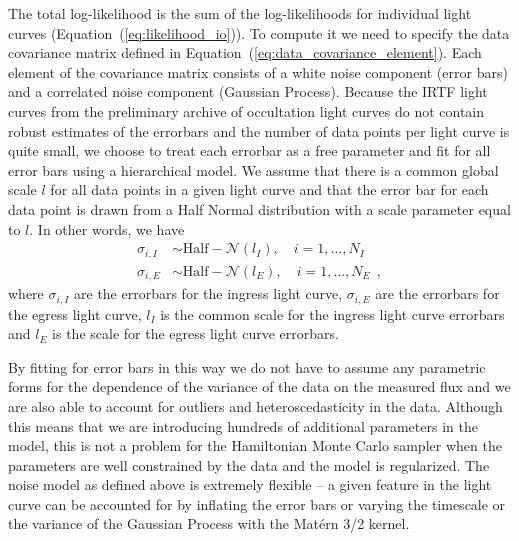 \documentclass[12pt,dvipsnames]{report}
\newcommand{\hquad}{~~}
\begin{document}
The total log-likelihood is the sum of the log-likelihoods for individual light curves 
(Equation~(\ref{eq:likelihood_io})). 
To compute it we need to specify the data covariance matrix defined in Equation~(\ref{eq:data_covariance_element}).
Each element of the covariance matrix consists of a white noise component (error bars) and a correlated noise component (Gaussian Process).
Because the IRTF light curves from the preliminary archive of occultation light curves 
do not contain robust estimates of the errorbars and the number of data points per light 
curve is quite small, we choose to treat each errorbar as a free parameter and fit for 
all error bars using a hierarchical model. 
We assume that there is a common global scale $l$ for all data points in a given light curve and that the error bar for each data point is drawn from a Half Normal distribution with a scale parameter equal to $l$.
In other words, we have 
\begin{align}
    \sigma_{i,I}&\sim \mathrm{Half}-\mathcal{N}(l_I),\quad i=1,\dots,N_I\\
    \sigma_{i,E}&\sim \mathrm{Half}-\mathcal{N}(l_E),\quad i=1,\dots, N_E
    \hquad,
\end{align}
where $\sigma_{i,I}$ are the errorbars for the ingress light curve, $\sigma_{i,E}$ are the errorbars for the egress light curve, $l_I$ is the common scale for the ingress light curve errorbars and $l_E$ is the scale for the egress light curve errorbars.

By fitting for error bars in this way we do not have to assume any parametric forms for the dependence of the variance of the data on the measured flux and we are also able to account for outliers and heteroscedasticity in the data.
Although this means that we are introducing hundreds of additional parameters in the model, this is not a problem for the Hamiltonian Monte Carlo sampler when the parameters are well constrained by the data and the model is regularized. 
The noise model as defined above is extremely flexible -- a given feature in the light curve can be accounted for by inflating the error bars or varying the timescale or the variance of the Gaussian Process with the Mat\'ern 3/2 kernel.
\end{document}
